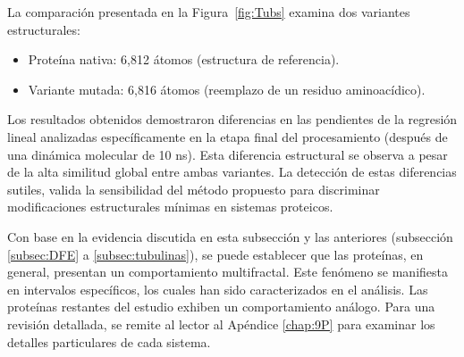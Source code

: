 	
	La comparaci\'{o}n presentada en la Figura~\ref{fig:Tubs} examina dos variantes estructurales:
	\begin{itemize}
		\item Prote\'{i}na nativa: 6,812 \'{a}tomos (estructura de referencia).
		\item Variante mutada: 6,816 \'{a}tomos (reemplazo de un residuo aminoac\'{i}dico).
	\end{itemize}
	
	Los resultados obtenidos demostraron diferencias en las pendientes de la regresi\'{o}n lineal analizadas espec\'{i}ficamente en la etapa final del procesamiento (despu\'{e}s de una din\'{a}mica molecular de 10 ns). Esta diferencia estructural se observa a pesar de la alta similitud global entre ambas variantes.
	La detecci\'{o}n de estas diferencias sutiles, valida la sensibilidad del m\'{e}todo propuesto para discriminar modificaciones estructurales m\'{i}nimas en sistemas proteicos.
	
	Con base en la evidencia discutida en esta subsección y las anteriores (subsección \ref{subsec:DFE} a \ref{subsec:tubulinas}), se puede establecer que las proteínas, en general, presentan un comportamiento multifractal. Este fenómeno se manifiesta en intervalos específicos, los cuales han sido caracterizados en el análisis. Las proteínas restantes del estudio exhiben un comportamiento análogo. Para una revisión detallada, se remite al lector al Apéndice \ref{chap:9P} para examinar los detalles particulares de cada sistema.
	
	
	\color{black}